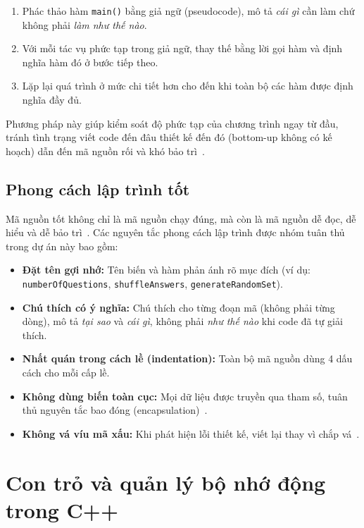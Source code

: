 \documentclass[11pt]{report}
\begin{document}
\begin{enumerate}[leftmargin=*, label=\arabic*.]
    \item Phác thảo hàm \texttt{main()} bằng giả ngữ (pseudocode), mô tả \textit{cái gì} cần làm chứ không phải \textit{làm như thế nào}.
    \item Với mỗi tác vụ phức tạp trong giả ngữ, thay thế bằng lời gọi hàm và định nghĩa hàm đó ở bước tiếp theo.
    \item Lặp lại quá trình ở mức chi tiết hơn cho đến khi toàn bộ các hàm được định nghĩa đầy đủ.
\end{enumerate}

Phương pháp này giúp kiểm soát độ phức tạp của chương trình ngay từ đầu, tránh tình trạng viết code đến đâu thiết kế đến đó (bottom-up không có kế hoạch) dẫn đến mã nguồn rối và khó bảo trì~\cite{nam2022}.

\subsection{Phong cách lập trình tốt}

Mã nguồn tốt không chỉ là mã nguồn chạy đúng, mà còn là mã nguồn dễ đọc, dễ hiểu và dễ bảo trì~\cite{kernighan1999}. Các nguyên tắc phong cách lập trình được nhóm tuân thủ trong dự án này bao gồm:

\begin{itemize}[leftmargin=*]
    \item \textbf{Đặt tên gợi nhớ:} Tên biến và hàm phản ánh rõ mục đích (ví dụ: \texttt{numberOfQuestions}, \texttt{shuffleAnswers}, \texttt{generateRandomSet}).
    \item \textbf{Chú thích có ý nghĩa:} Chú thích cho từng đoạn mã (không phải từng dòng), mô tả \textit{tại sao} và \textit{cái gì}, không phải \textit{như thế nào} khi code đã tự giải thích.
    \item \textbf{Nhất quán trong cách lề (indentation):} Toàn bộ mã nguồn dùng 4 dấu cách cho mỗi cấp lề.
    \item \textbf{Không dùng biến toàn cục:} Mọi dữ liệu được truyền qua tham số, tuân thủ nguyên tắc bao đóng (encapsulation)~\cite{stroustrup2013}.
    \item \textbf{Không vá víu mã xấu:} Khi phát hiện lỗi thiết kế, viết lại thay vì chắp vá~\cite{kernighan1999}.
\end{itemize}

\section{Con trỏ và quản lý bộ nhớ động trong C++}
\end{document}
